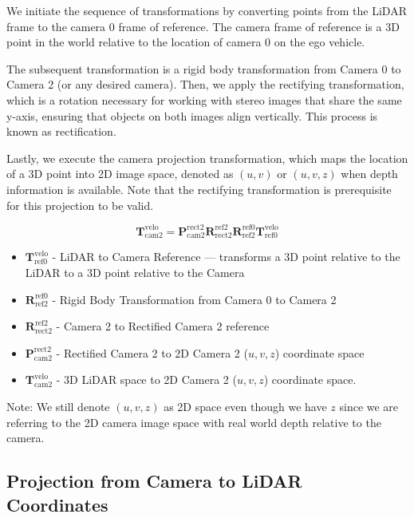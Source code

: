 \documentclass[letterpaper, 10 pt, conference]{ieeeconf}  %
\begin{document}
We initiate the sequence of transformations by converting points from the LiDAR frame to the camera 0 frame of reference. The camera frame of reference is a 3D point in the world relative to the location of camera 0 on the ego vehicle.

The subsequent transformation is a rigid body transformation from Camera 0 to Camera 2 (or any desired camera). Then, we apply the rectifying transformation, which is a rotation necessary for working with stereo images that share the same y-axis, ensuring that objects on both images align vertically. This process is known as rectification. \cite{CoordinateTransforms}

Lastly, we execute the camera projection transformation, which maps the location of a 3D point into 2D image space, denoted as \( (u, v) \) or \( (u, v, z) \) when depth information is available. Note that the rectifying transformation is prerequisite for this projection to be valid.

\begin{equation}
\mathbf{T}_{\text{cam2}}^{\text{velo}} = \mathbf{P}_{\text{cam2}}^{\text{rect2}} \mathbf{R}_{\text{rect2}}^{\text{ref2}} \mathbf{R}_{\text{ref2}}^{\text{ref0}} \mathbf{T}_{\text{ref0}}^{\text{velo}}
\label{eq:transformation_matrix_lidar_camera}
\end{equation}

\begin{itemize}
  \item $\mathbf{T}_{\text{ref0}}^{\text{velo}}$ - LiDAR to Camera Reference — transforms a 3D point relative to the LiDAR to a 3D point relative to the Camera
  \item $\mathbf{R}_{\text{ref2}}^{\text{ref0}}$ - Rigid Body Transformation from Camera 0 to Camera 2
  \item $\mathbf{R}_{\text{rect2}}^{\text{ref2}}$ - Camera 2 to Rectified Camera 2 reference
  \item $\mathbf{P}_{\text{cam2}}^{\text{rect2}}$ - Rectified Camera 2 to 2D Camera 2 (\(u, v, z\)) coordinate space
  \item $\mathbf{T}_{\text{cam2}}^{\text{velo}}$ - 3D LiDAR space to 2D Camera 2 (\(u, v, z\)) coordinate space.
\end{itemize}
Note: We still denote \((u, v, z)\) as 2D space even though we have \(z\) since we are referring to the 2D camera image space with real world depth relative to the camera.


\subsection{Projection from Camera to LiDAR Coordinates}
\end{document}
